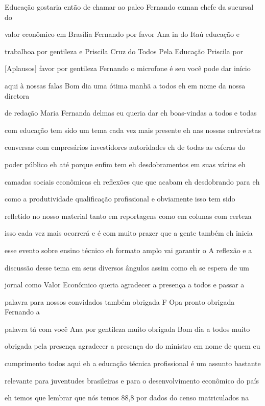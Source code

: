 \documentclass[a4paper,12pt]{article}
\begin{document}
Educação gostaria então de chamar ao palco Fernando exman chefe da sucursal do

valor econômico em Brasília Fernando por favor Ana in do Itaú educação e

trabalhoa por gentileza e Priscila Cruz do Todos Pela Educação Priscila por

[Aplausos] favor por gentileza Fernando o microfone é seu você pode dar início

aqui à nossas falas Bom dia uma ótima manhã a todos eh em nome da nossa diretora

de redação Maria Fernanda delmas eu queria dar eh boas-vindas a todos e todas

com educação tem sido um tema cada vez mais presente eh nas nossas entrevistas

conversas com empresários investidores autoridades eh de todas as esferas do

poder público eh até porque enfim tem eh desdobramentos em suas várias eh

camadas sociais econômicas eh reflexões que que acabam eh desdobrando para eh

como a produtividade qualificação profissional e obviamente isso tem sido

refletido no nosso material tanto em reportagens como em colunas com certeza

isso cada vez mais ocorrerá e é com muito prazer que a gente também eh inicia

esse evento sobre ensino técnico eh formato amplo vai garantir o A reflexão e a

discussão desse tema em seus diversos ângulos assim como eh se espera de um

jornal como Valor Econômico queria agradecer a presença a todos e passar a

palavra para nossos convidados também obrigada F Opa pronto obrigada Fernando a

palavra tá com você Ana por gentileza muito obrigada Bom dia a todos muito

obrigada pela presença agradecer a presença do do ministro em nome de quem eu

cumprimento todos aqui eh a educação técnica profissional é um assunto bastante

relevante para juventudes brasileiras e para o desenvolvimento econômico do país

eh temos que lembrar que nós temos 88,8 por dados do censo matriculados na
\end{document}
